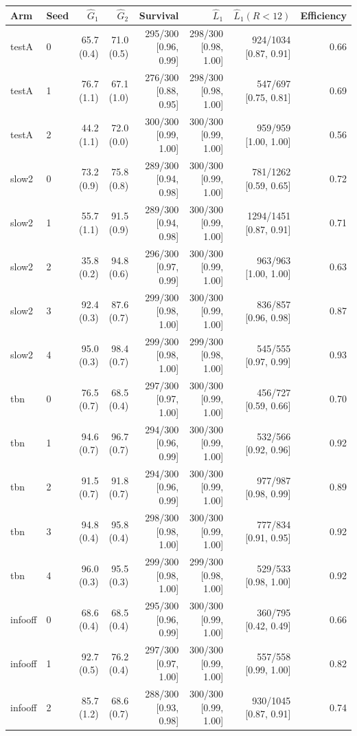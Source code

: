 \begin{tabular}{llrrrrrr}
\toprule
Arm & Seed & $\hat G_1$ & $\hat G_2$ & Survival & $\hat L_1$ & $\hat L_1(R<12)$ & Efficiency \\
\midrule
testA & 0 & 65.7 (0.4) & 71.0 (0.5) & 295/300 [0.96, 0.99] & 298/300 [0.98, 1.00] & 924/1034 [0.87, 0.91] & 0.66 \\
testA & 1 & 76.7 (1.1) & 67.1 (1.0) & 276/300 [0.88, 0.95] & 298/300 [0.98, 1.00] & 547/697 [0.75, 0.81] & 0.69 \\
testA & 2 & 44.2 (1.1) & 72.0 (0.0) & 300/300 [0.99, 1.00] & 300/300 [0.99, 1.00] & 959/959 [1.00, 1.00] & 0.56 \\
slow2 & 0 & 73.2 (0.9) & 75.8 (0.8) & 289/300 [0.94, 0.98] & 300/300 [0.99, 1.00] & 781/1262 [0.59, 0.65] & 0.72 \\
slow2 & 1 & 55.7 (1.1) & 91.5 (0.9) & 289/300 [0.94, 0.98] & 300/300 [0.99, 1.00] & 1294/1451 [0.87, 0.91] & 0.71 \\
slow2 & 2 & 35.8 (0.2) & 94.8 (0.6) & 296/300 [0.97, 0.99] & 300/300 [0.99, 1.00] & 963/963 [1.00, 1.00] & 0.63 \\
slow2 & 3 & 92.4 (0.3) & 87.6 (0.7) & 299/300 [0.98, 1.00] & 300/300 [0.99, 1.00] & 836/857 [0.96, 0.98] & 0.87 \\
slow2 & 4 & 95.0 (0.3) & 98.4 (0.7) & 299/300 [0.98, 1.00] & 299/300 [0.98, 1.00] & 545/555 [0.97, 0.99] & 0.93 \\
tbn & 0 & 76.5 (0.7) & 68.5 (0.4) & 297/300 [0.97, 1.00] & 300/300 [0.99, 1.00] & 456/727 [0.59, 0.66] & 0.70 \\
tbn & 1 & 94.6 (0.7) & 96.7 (0.7) & 294/300 [0.96, 0.99] & 300/300 [0.99, 1.00] & 532/566 [0.92, 0.96] & 0.92 \\
tbn & 2 & 91.5 (0.7) & 91.8 (0.7) & 294/300 [0.96, 0.99] & 300/300 [0.99, 1.00] & 977/987 [0.98, 0.99] & 0.89 \\
tbn & 3 & 94.8 (0.4) & 95.8 (0.4) & 298/300 [0.98, 1.00] & 300/300 [0.99, 1.00] & 777/834 [0.91, 0.95] & 0.92 \\
tbn & 4 & 96.0 (0.3) & 95.5 (0.3) & 299/300 [0.98, 1.00] & 299/300 [0.98, 1.00] & 529/533 [0.98, 1.00] & 0.92 \\
infooff & 0 & 68.6 (0.4) & 68.5 (0.4) & 295/300 [0.96, 0.99] & 300/300 [0.99, 1.00] & 360/795 [0.42, 0.49] & 0.66 \\
infooff & 1 & 92.7 (0.5) & 76.2 (0.4) & 297/300 [0.97, 1.00] & 300/300 [0.99, 1.00] & 557/558 [0.99, 1.00] & 0.82 \\
infooff & 2 & 85.7 (1.2) & 68.6 (0.7) & 288/300 [0.93, 0.98] & 300/300 [0.99, 1.00] & 930/1045 [0.87, 0.91] & 0.74 \\

\end{tabular}
